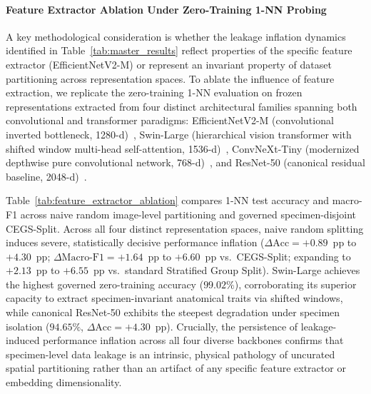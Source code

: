 \documentclass[a4paper,fleqn]{cas-sc}
\begin{document}
\paragraph{Feature Extractor Ablation Under Zero-Training 1-NN Probing}
A key methodological consideration is whether the leakage inflation dynamics identified in Table~\ref{tab:master_results} reflect properties of the specific feature extractor (EfficientNetV2-M) or represent an invariant property of dataset partitioning across representation spaces. To ablate the influence of feature extraction, we replicate the zero-training 1-NN evaluation on frozen representations extracted from four distinct architectural families spanning both convolutional and transformer paradigms: EfficientNetV2-M (convolutional inverted bottleneck, 1280-d)~\cite{efficientnetv2}, Swin-Large (hierarchical vision transformer with shifted window multi-head self-attention, 1536-d)~\cite{swin}, ConvNeXt-Tiny (modernized depthwise pure convolutional network, 768-d)~\cite{convnext}, and ResNet-50 (canonical residual baseline, 2048-d)~\cite{resnet}. 

Table~\ref{tab:feature_extractor_ablation} compares 1-NN test accuracy and macro-F1 across naive random image-level partitioning and governed specimen-disjoint CEGS-Split. Across all four distinct representation spaces, naive random splitting induces severe, statistically decisive performance inflation ($\Delta\text{Acc} = +0.89$~pp to $+4.30$~pp; $\Delta\text{Macro-F1} = +1.64$~pp to $+6.60$~pp vs.\ CEGS-Split; expanding to $+2.13$~pp to $+6.55$~pp vs.\ standard Stratified Group Split). Swin-Large achieves the highest governed zero-training accuracy ($99.02\%$), corroborating its superior capacity to extract specimen-invariant anatomical traits via shifted windows, while canonical ResNet-50 exhibits the steepest degradation under specimen isolation ($94.65\%$, $\Delta\text{Acc} = +4.30$~pp). Crucially, the persistence of leakage-induced performance inflation across all four diverse backbones confirms that specimen-level data leakage is an intrinsic, physical pathology of uncurated spatial partitioning rather than an artifact of any specific feature extractor or embedding dimensionality.
\end{document}
